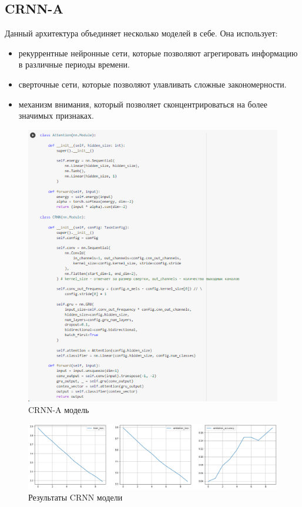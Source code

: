 \documentclass[a4paper,12pt]{article}
\begin{document}
	\subsection{CRNN-A}
	
	Данный архитектура объединяет несколько моделей в себе. Она использует:
	\begin{itemize}
		\item рекуррентные нейронные сети, которые позволяют агрегировать информацию в различные периоды времени.
		\item сверточные сети, которые позволяют улавливать сложные закономерности.
		\item механизм внимания, который позволяет сконцентрироваться на более значимых признаках.
	\end{itemize}
	
	\begin{figure}[H]
		\centering
		\includegraphics[width=1\linewidth]{Image/CRNN}
		\caption{CRNN-A модель}
		\label{fig:crnn}
	\end{figure}
	
 	\begin{figure}[H]
 		\centering
 		\includegraphics[width=1\linewidth]{Image/CRNN_train.png}
 		\caption{Результаты CRNN модели}
 		\label{fig:crnn}
 	\end{figure}
 
\end{document}
